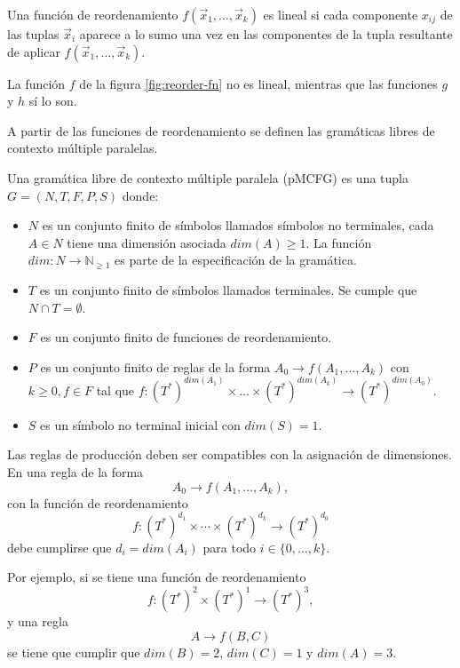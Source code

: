 \begin{definition}
    Una función de reordenamiento $f(\vec{x}_1, \ldots, \vec{x}_k)$ es lineal si cada componente $x_{ij}$ de las tuplas $\vec{x}_i$ aparece a lo sumo una vez en las componentes de la tupla resultante de aplicar $f(\vec{x}_1, \ldots, \vec{x}_k)$.
\end{definition}

La función $f$ de la figura \ref{fig:reorder-fn} no es lineal, mientras que las funciones $g$ y $h$ sí lo son.

A partir de las funciones de reordenamiento se definen las gramáticas libres de contexto múltiple paralelas.

\begin{definition}
    Una gramática libre de contexto múltiple paralela (pMCFG) es una tupla $G = (N, T, F, P, S)$ donde:

    \begin{itemize}
        \item $N$ es un conjunto finito de símbolos llamados símbolos no terminales, cada $A \in N$ tiene una dimensión asociada $dim(A) \geq 1$. La función $dim: N \to \mathbb{N}_{\geq 1}$ es parte de la especificación de la gramática.
        \item $T$ es un conjunto finito de símbolos llamados terminales. Se cumple que $N \cap T = \emptyset$.
        \item $F$ es un conjunto finito de funciones de reordenamiento.
        \item $P$ es un conjunto finito de reglas de la forma $A_0 \to f(A_1, \ldots, A_k)$ con $k \geq 0, f \in F$ tal que $f: (T^*)^{dim(A_1)} \times \ldots \times (T^*)^{dim(A_k)} \to (T^*)^{dim(A_0)}$.
        \item $S$ es un símbolo no terminal inicial con $dim(S) = 1$.
    \end{itemize}
\end{definition}

Las reglas de producción deben ser compatibles con la asignación de dimensiones. En una regla de la forma
$$
    A_0 \to f(A_1,\ldots,A_k),
$$
con la función de reordenamiento
$$
    f : (T^*)^{d_1} \times \cdots \times (T^*)^{d_k}
    \to (T^*)^{d_0}
$$
debe cumplirse que $d_i = dim(A_i)$ para todo $i \in \{0, \dots, k\}$.

Por ejemplo, si se tiene una función de reordenamiento
$$
    f : (T^*)^2 \times (T^*)^1 \to (T^*)^3,
$$
y una regla
$$
    A \to f(B,C)
$$
se tiene que cumplir que $dim(B)=2$, $dim(C)=1$ y $dim(A)=3$.


